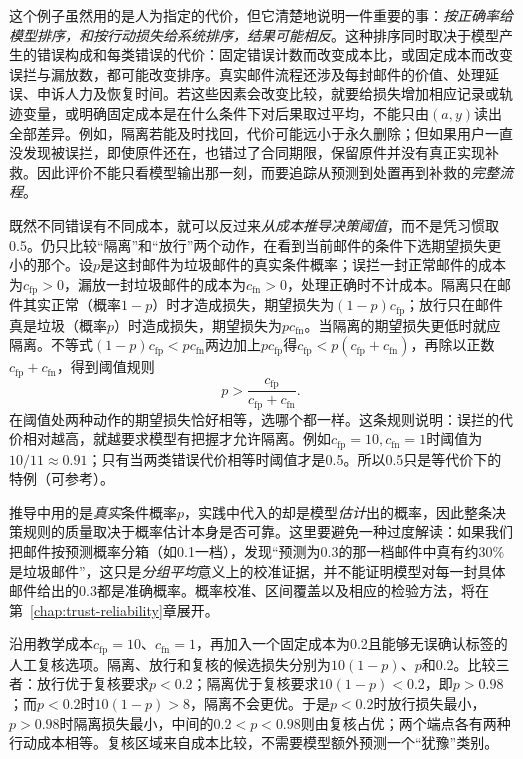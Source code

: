 这个例子虽然用的是人为指定的代价，但它清楚地说明一件重要的事：\emph{按正确率给模型排序，和按行动损失给系统排序，结果可能相反}。这种排序同时取决于模型产生的错误构成和每类错误的代价：固定错误计数而改变成本比，或固定成本而改变误拦与漏放数，都可能改变排序。真实邮件流程还涉及每封邮件的价值、处理延误、申诉人力及恢复时间。若这些因素会改变比较，就要给损失增加相应记录或轨迹变量，或明确固定成本是在什么条件下对后果取过平均，不能只由$(a,y)$读出全部差异。例如，隔离若能及时找回，代价可能远小于永久删除；但如果用户一直没发现被误拦，即使原件还在，也错过了合同期限，保留原件并没有真正实现补救。因此评价不能只看模型输出那一刻，而要追踪从预测到处置再到补救的\emph{完整流程}。

既然不同错误有不同成本，就可以反过来\emph{从成本推导决策阈值}，而不是凭习惯取0.5。仍只比较“隔离”和“放行”两个动作，在看到当前邮件的条件下选期望损失更小的那个。设$p$是这封邮件为垃圾邮件的真实条件概率；误拦一封正常邮件的成本为$c_{\mathrm{fp}}>0$，漏放一封垃圾邮件的成本为$c_{\mathrm{fn}}>0$，处理正确时不计成本。隔离只在邮件其实正常（概率$1-p$）时才造成损失，期望损失为$(1-p)c_{\mathrm{fp}}$；放行只在邮件真是垃圾（概率$p$）时造成损失，期望损失为$pc_{\mathrm{fn}}$。当隔离的期望损失更低时就应隔离。不等式$(1-p)c_{\mathrm{fp}}<pc_{\mathrm{fn}}$两边加上$pc_{\mathrm{fp}}$得$c_{\mathrm{fp}}<p(c_{\mathrm{fp}}+c_{\mathrm{fn}})$，再除以正数$c_{\mathrm{fp}}+c_{\mathrm{fn}}$，得到阈值规则
\begin{equation}
 p>\frac{c_{\mathrm{fp}}}{c_{\mathrm{fp}}+c_{\mathrm{fn}}}.
 \label{eq:trust-cost-threshold}
\end{equation}
在阈值处两种动作的期望损失恰好相等，选哪个都一样。这条规则说明：误拦的代价相对越高，就越要求模型有把握才允许隔离。例如$c_{\mathrm{fp}}=10,c_{\mathrm{fn}}=1$时阈值为$10/11\approx0.91$；只有当两类错误代价相等时阈值才是0.5。所以0.5只是等代价下的特例（可参考）。

推导中用的是\emph{真实}条件概率$p$，实践中代入的却是模型\emph{估计}出的概率，因此整条决策规则的质量取决于概率估计本身是否可靠。这里要避免一种过度解读：如果我们把邮件按预测概率分箱（如0.1一档），发现“预测为0.3的那一档邮件中真有约30\%是垃圾邮件”，这只是\emph{分组平均}意义上的校准证据，并不能证明模型对每一封具体邮件给出的0.3都是准确概率。概率校准、区间覆盖以及相应的检验方法，将在第~\ref{chap:trust-reliability}章展开。

\begin{example}[增加复核选项后的决策]
\label{ex:trust-review-cost}
沿用教学成本$c_{\mathrm{fp}}=10$、$c_{\mathrm{fn}}=1$，再加入一个固定成本为0.2且能够无误确认标签的人工复核选项。隔离、放行和复核的候选损失分别为$10(1-p)$、$p$和0.2。比较三者：放行优于复核要求$p<0.2$；隔离优于复核要求$10(1-p)<0.2$，即$p>0.98$；而$p<0.2$时$10(1-p)>8$，隔离不会更优。于是$p<0.2$时放行损失最小，$p>0.98$时隔离损失最小，中间的$0.2<p<0.98$则由复核占优；两个端点各有两种行动成本相等。复核区域来自成本比较，不需要模型额外预测一个“犹豫”类别。
\end{example}

